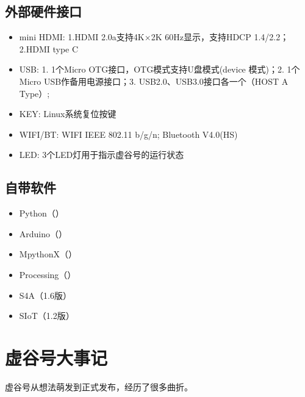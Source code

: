 \documentclass[letterpaper,10pt,english]{sphinxmanual}
\begin{document}
\subsection{外部硬件接口}
\label{\detokenize{01.about/1.2-function:id4}}\begin{itemize}
\item {} 
mini HDMI: 1.HDMI 2.0a支持4K×2K 60Hz显示，支持HDCP 1.4/2.2；2.HDMI type C

\item {} 
USB: 1. 1个Micro OTG接口，OTG模式支持U盘模式(device 模式)；2. 1个Micro USB作备用电源接口；3. USB2.0、USB3.0接口各一个（HOST A Type）;

\item {} 
KEY: Linux系统复位按键

\item {} 
WIFI/BT: WIFI IEEE 802.11 b/g/n; Bluetooth V4.0(HS)

\item {} 
LED: 3个LED灯用于指示虚谷号的运行状态

\end{itemize}


\subsection{自带软件}
\label{\detokenize{01.about/1.2-function:id5}}\begin{itemize}
\item {} 
Python（）

\item {} 
Arduino（）

\item {} 
MpythonX（）

\item {} 
Processing（）

\item {} 
S4A（1.6版）

\item {} 
SIoT（1.2版）

\end{itemize}


\section{虚谷号大事记}
\label{\detokenize{01.about/1.3-log:id1}}\label{\detokenize{01.about/1.3-log::doc}}
虚谷号从想法萌发到正式发布，经历了很多曲折。
\end{document}
